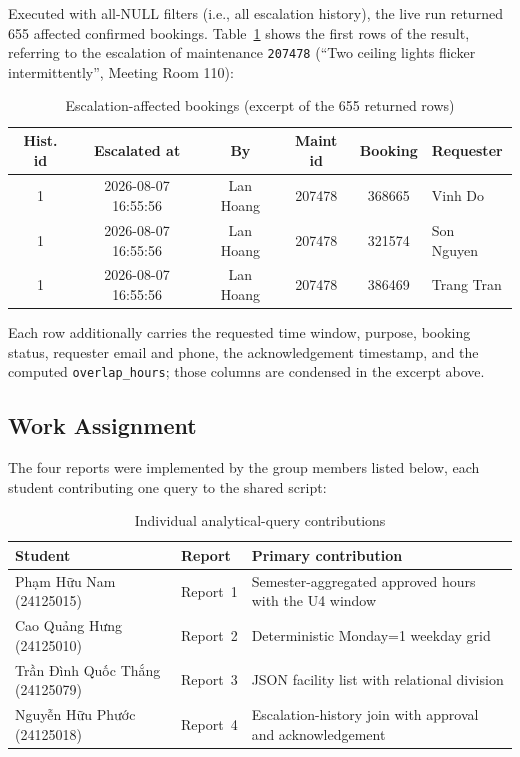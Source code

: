 Executed with all-NULL filters (i.e., all escalation history), the live run
returned 655 affected confirmed bookings. Table~\ref{tab:aq-q5} shows the
first rows of the result, referring to the escalation of maintenance
\texttt{207478} (``Two ceiling lights flicker intermittently'', Meeting
Room 110):

\begin{table}[htbp]
    \centering
    \small
    \begin{tabularx}{\textwidth}{@{} c c c c c X @{}}
        \toprule
        \textbf{Hist. id} & \textbf{Escalated at} & \textbf{By} &
        \textbf{Maint id} & \textbf{Booking} & \textbf{Requester} \\
        \midrule
        1 & 2026-08-07 16:55:56 & Lan Hoang & 207478 & 368665 &
        Vinh Do \\
        1 & 2026-08-07 16:55:56 & Lan Hoang & 207478 & 321574 &
        Son Nguyen \\
   1 & 2026-08-07 16:55:56 & Lan Hoang & 207478 & 386469 &
        Trang Tran \\
        \bottomrule
    \end{tabularx}
    \caption{Escalation-affected bookings (excerpt of the 655 returned rows)}
    \label{tab:aq-q5}
\end{table}

Each row additionally carries the requested time window, purpose, booking
status, requester email and phone, the acknowledgement timestamp, and the
computed \texttt{overlap\_hours}; those columns are condensed in the excerpt
above.

\subsection{Work Assignment}

The four reports were implemented by the group members listed below, each
student contributing one query to the shared script:

\begin{table}[htbp]
    \centering
    \small
    \begin{tabularx}{\textwidth}{X l X}
        \toprule
        \textbf{Student} & \textbf{Report} & \textbf{Primary contribution} \\
        \midrule
        Phạm Hữu Nam (24125015) & Report~1 & Semester-aggregated approved hours
        with the U4 window \\
        Cao Quảng Hưng (24125010) & Report~2 & Deterministic Monday=1 weekday grid \\
        Trần Đình Quốc Thắng (24125079) & Report~3 & JSON facility list with
        relational division \\
        Nguyễn Hữu Phước (24125018) & Report~4 & Escalation-history join with
        approval and acknowledgement \\
        \bottomrule
    \end{tabularx}
    \caption{Individual analytical-query contributions}
    \label{tab:query-contributions}
\end{table}